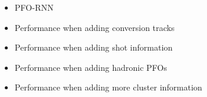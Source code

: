 \begin{itemize}
\item PFO-RNN

\item Performance when adding conversion tracks

\item Performance when adding shot information

\item Performance when adding hadronic PFOs

\item Performance when adding more cluster information

\end{itemize}

